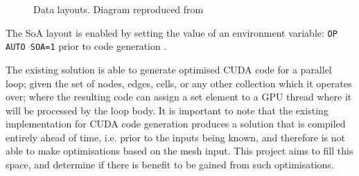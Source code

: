 \begin{figure}[h]
  \centering

  \quad

  \caption{\label{fig:soa_v_aos} Data layouts. Diagram reproduced from \cite{gpudesign}}
\end{figure}

\noindent The SoA layout is enabled by setting the value of an environment variable: \verb|OP AUTO SOA=1| prior to code generation \cite[p13]{manual}.
\par
The existing solution is able to generate optimised CUDA code for a parallel loop; given the set of nodes, edges, cells, or any other collection which it operates over; where the resulting code can assign a set element to a GPU thread where it will be processed by the loop body. It is important to note that the existing implementation for CUDA code generation produces a solution that is compiled entirely ahead of time, i.e. prior to the inputs being known, and therefore is not able to make optimisations based on the mesh input. This project aims to fill this space, and determine if there is benefit to be gained from such optimisations.

